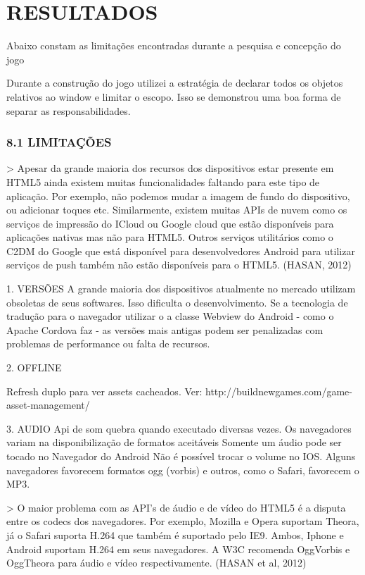 \documentclass[11pt,a4paper]{article}
\begin{document}
\section{RESULTADOS}

Abaixo constam as limitações encontradas durante a pesquisa e concepção do jogo

Durante a construção do jogo utilizei a estratégia de declarar todos
os objetos relativos ao window e limitar o escopo. Isso se demonstrou
uma boa forma de separar as responsabilidades.

\subsubsection{8.1  LIMITAÇÕES}

> Apesar da grande maioria dos recursos dos dispositivos estar presente
em HTML5 ainda existem muitas funcionalidades faltando para este tipo
de aplicação. Por exemplo, não podemos mudar a imagem de fundo do
dispositivo, ou adicionar toques etc. Similarmente, existem muitas
APIs de nuvem como os serviços de impressão do ICloud ou Google
cloud que estão disponíveis para aplicações nativas mas não para
HTML5. Outros serviços utilitários como o C2DM do Google que está
disponível para desenvolvedores Android para utilizar serviços de push
também não estão disponíveis para o HTML5. (HASAN, 2012)

1.  VERSÕES
A grande maioria dos dispositivos atualmente no mercado utilizam
obsoletas de seus softwares. Isso dificulta o desenvolvimento. Se a
tecnologia de tradução para o navegador utilizar o a classe Webview do
Android - como o Apache Cordova faz - as versões mais antigas podem ser
penalizadas com problemas de performance ou falta de recursos.

2. OFFLINE

Refresh duplo para ver assets cacheados. Ver:
http://buildnewgames.com/game-asset-management/

3. AUDIO
Api de som quebra quando executado diversas vezes.
Os navegadores variam na disponibilização de formatos aceitáveis
Somente um áudio pode ser tocado no Navegador do Android
Não é possível trocar o volume no IOS.
Alguns navegadores favorecem formatos ogg (vorbis) e outros, como o
Safari, favorecem o MP3.

> O maior problema com as API's de áudio e de vídeo do HTML5 é
a disputa entre os codecs dos navegadores. Por exemplo, Mozilla e
Opera suportam Theora, já o Safari suporta H.264 que também é
suportado pelo IE9. Ambos, Iphone e Android suportam H.264 em seus
navegadores. A W3C recomenda OggVorbis e OggTheora para áudio e vídeo
respectivamente. (HASAN et al, 2012)
\end{document}
